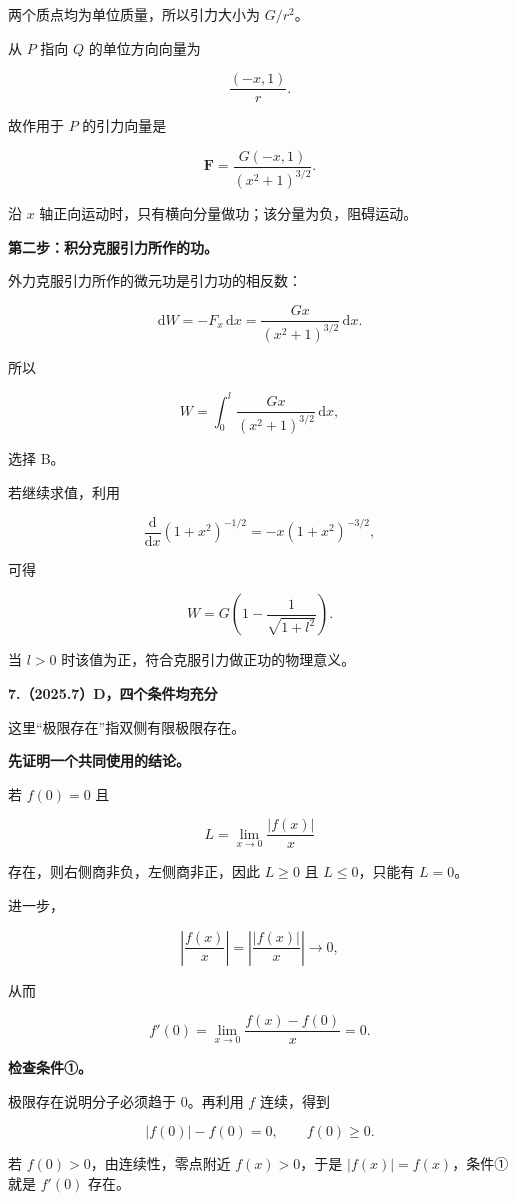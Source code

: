 \documentclass[UTF8,11pt,fontset=windows]{ctexart}
\begin{document}
两个质点均为单位质量，所以引力大小为 $G/r^2$。

从 $P$ 指向 $Q$ 的单位方向向量为

$$
\frac{(-x,1)}r.
$$

故作用于 $P$ 的引力向量是

$$
\boldsymbol F=\frac{G(-x,1)}{(x^2+1)^{3/2}}.
$$

沿 $x$ 轴正向运动时，只有横向分量做功；该分量为负，阻碍运动。

\textbf{第二步：积分克服引力所作的功。}

外力克服引力所作的微元功是引力功的相反数：

$$
\mathrm dW=-F_x\,\mathrm dx
=\frac{Gx}{(x^2+1)^{3/2}}\,\mathrm dx.
$$

所以

$$
\boxed{W=\int_0^l\frac{Gx}{(x^2+1)^{3/2}}\,\mathrm dx},
$$

选择 B。

若继续求值，利用

$$
\frac{\mathrm d}{\mathrm dx}(1+x^2)^{-1/2}
=-x(1+x^2)^{-3/2},
$$

可得

$$
W=G\left(1-\frac1{\sqrt{1+l^2}}\right).
$$

当 $l>0$ 时该值为正，符合克服引力做正功的物理意义。

\clearpage

\textbf{7.（2025.7）D，四个条件均充分}

这里“极限存在”指双侧有限极限存在。

\textbf{先证明一个共同使用的结论。}

若 $f(0)=0$ 且

$$
L=\lim_{x\to0}\frac{|f(x)|}{x}
$$

存在，则右侧商非负，左侧商非正，因此 $L\ge0$ 且 $L\le0$，只能有 $L=0$。

进一步，

$$
\left|\frac{f(x)}x\right|
=\left|\frac{|f(x)|}x\right|\longrightarrow0,
$$

从而

$$
f'(0)=\lim_{x\to0}\frac{f(x)-f(0)}x=0.
$$

\textbf{检查条件①。}

极限存在说明分子必须趋于 $0$。再利用 $f$ 连续，得到

$$
|f(0)|-f(0)=0,\qquad f(0)\ge0.
$$

若 $f(0)>0$，由连续性，零点附近 $f(x)>0$，于是 $|f(x)|=f(x)$，条件①就是 $f'(0)$ 存在。
\end{document}
